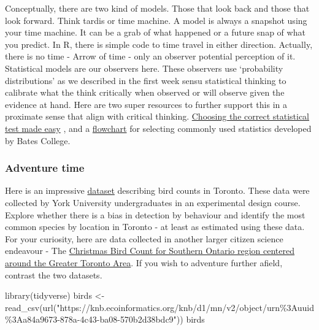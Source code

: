 \documentclass[
]{book}
\newenvironment{Shaded}{\begin{snugshade}}{\end{snugshade}}
\newcommand{\FunctionTok}[1]{\textcolor[rgb]{0.00,0.00,0.00}{#1}}
\newcommand{\NormalTok}[1]{#1}
\newcommand{\OtherTok}[1]{\textcolor[rgb]{0.56,0.35,0.01}{#1}}
\newcommand{\StringTok}[1]{\textcolor[rgb]{0.31,0.60,0.02}{#1}}
\begin{document}
Conceptually, there are two kind of models. Those that look back and those that look forward. Think tardis or time machine. A model is always a snapshot using your time machine. It can be a grab of what happened or a future snap of what you predict. In R, there is simple code to time travel in either direction. Actually, there is no time - Arrow of time - only an observer potential perception of it. Statistical models are our observers here. These observers use `probability distributions' as we described in the first week sensu statistical thinking to calibrate what the think critically when observed or will observe given the evidence at hand. Here are two super resources to further support this in a proximate sense that align with critical thinking. \href{https://med.cmb.ac.lk/SMJ/VOLUME\%203\%20DOWNLOADS/Page\%2033-37\%20-\%20Choosing\%20the\%20correct\%20statistical\%20test\%20made\%20easy.pdf}{Choosing the correct statistical test made easy} \citep{RN7257}, and a \href{./flowchart.jpg}{flowchart} for selecting commonly used statistics developed by Bates College.

\hypertarget{adventure-time-3}{%
\subsubsection*{Adventure time}\label{adventure-time-3}}

Here is an impressive \href{https://knb.ecoinformatics.org/view/doi\%3A10.5063\%2F6M357V}{dataset} describing bird counts in Toronto. These data were collected by York University undergraduates in an experimental design course. Explore whether there is a bias in detection by behaviour and identify the most common species by location in Toronto - at least as estimated using these data. For your curiosity, here are data collected in another larger citizen science endeavour - The \href{https://knb.ecoinformatics.org/view/doi\%3A10.5063\%2FF1RF5SDJ}{Christmas Bird Count for Southern Ontario region centered around the Greater Toronto Area}. If you wish to adventure further afield, contrast the two datasets.

\begin{Shaded}
\begin{Highlighting}[]
\FunctionTok{library}\NormalTok{(tidyverse)}
\NormalTok{birds }\OtherTok{\textless{}{-}} \FunctionTok{read\_csv}\NormalTok{(}\FunctionTok{url}\NormalTok{(}\StringTok{"https://knb.ecoinformatics.org/knb/d1/mn/v2/object/urn\%3Auuid\%3Aa84a9673{-}878a{-}4c43{-}ba08{-}570b2d38bdc9"}\NormalTok{))}
\NormalTok{birds}
\end{Highlighting}
\end{Shaded}
\end{document}
